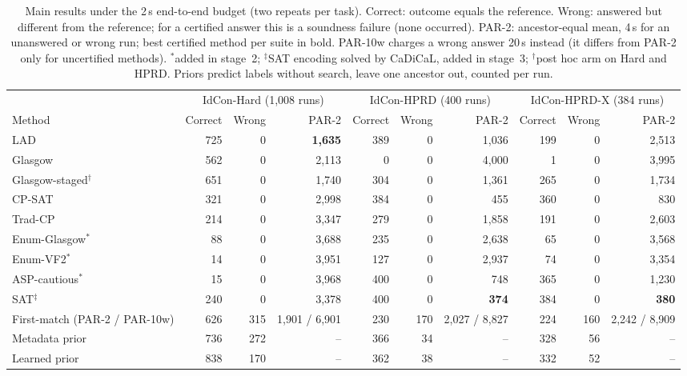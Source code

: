 \begin{table}[t]
\caption{Main results under the 2\,s end-to-end budget (two repeats per task). Correct: outcome equals the reference. Wrong: answered but different from the reference; for a certified answer this is a soundness failure (none occurred). PAR-2: ancestor-equal mean, 4\,s for an unanswered or wrong run; best certified method per suite in bold. PAR-10w charges a wrong answer 20\,s instead (it differs from PAR-2 only for uncertified methods). $^\ast$added in stage~2; $^\ddagger$SAT encoding solved by CaDiCaL, added in stage~3; $^\dagger$post hoc arm on Hard and HPRD. Priors predict labels without search, leave one ancestor out, counted per run.}
\label{tab:main}
\centering\small\setlength{\tabcolsep}{4.5pt}
\begin{tabular}{l rrr rrr rrr}
\toprule
 & \multicolumn{3}{c}{IdCon-Hard (1,008 runs)} & \multicolumn{3}{c}{IdCon-HPRD (400 runs)} & \multicolumn{3}{c}{IdCon-HPRD-X (384 runs)}\\
\cmidrule(lr){2-4}\cmidrule(lr){5-7}\cmidrule(lr){8-10}
Method & Correct & Wrong & PAR-2 & Correct & Wrong & PAR-2 & Correct & Wrong & PAR-2\\
\midrule
LAD & 725 & 0 & \textbf{1,635} & 389 & 0 & 1,036 & 199 & 0 & 2,513\\
Glasgow & 562 & 0 & 2,113 & 0 & 0 & 4,000 & 1 & 0 & 3,995\\
Glasgow-staged$^\dagger$ & 651 & 0 & 1,740 & 304 & 0 & 1,361 & 265 & 0 & 1,734\\
CP-SAT & 321 & 0 & 2,998 & 384 & 0 & 455 & 360 & 0 & 830\\
Trad-CP & 214 & 0 & 3,347 & 279 & 0 & 1,858 & 191 & 0 & 2,603\\
Enum-Glasgow$^\ast$ & 88 & 0 & 3,688 & 235 & 0 & 2,638 & 65 & 0 & 3,568\\
Enum-VF2$^\ast$ & 14 & 0 & 3,951 & 127 & 0 & 2,937 & 74 & 0 & 3,354\\
ASP-cautious$^\ast$ & 15 & 0 & 3,968 & 400 & 0 & 748 & 365 & 0 & 1,230\\
SAT$^\ddagger$ & 240 & 0 & 3,378 & 400 & 0 & \textbf{374} & 384 & 0 & \textbf{380}\\
\midrule
First-match (PAR-2 / PAR-10w) & 626 & 315 & 1,901 / 6,901 & 230 & 170 & 2,027 / 8,827 & 224 & 160 & 2,242 / 8,909\\
Metadata prior & 736 & 272 & -- & 366 & 34 & -- & 328 & 56 & --\\
Learned prior & 838 & 170 & -- & 362 & 38 & -- & 332 & 52 & --\\
\bottomrule
\end{tabular}
\end{table}
